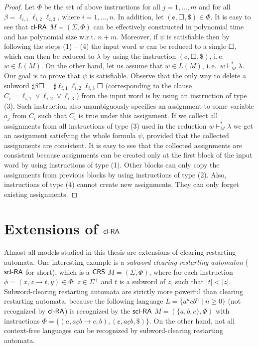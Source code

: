 \begin{proof}
Let $\Phi$ be the set of above instructions for all $j = 1, \ldots, m$ and for all $\beta = \ell_{i,1} \ell_{i,2} \ell_{i,3}$, where $i = 1, \ldots, n$. In addition, let $(\cent, \Square, \$) \in \Phi$. It is easy to see that $\clRA$ $M = (\Sigma, \Phi)$ can be effectively constructed in polynomial time and has polynomial size w.r.t. $n + m$. Moreover, if $\psi$ is satisfiable then by following the steps (1) -- (4) the input word $w$ can be reduced to a single $\Square$, which can then be reduced to $\lambda$ by using the instruction $(\cent, \Square, \$)$, i.\,e.\ $w \in L(M)$. On the other hand, let us assume that $w \in L(M)$, i.\,e.\ $w \vdash_M^* \lambda$. Our goal is to prove that $\psi$ is satisfiable. Observe that the only way to delete a subword $\sharp \beta \Square = \sharp \ell_{i,1} \ell_{i,2} \ell_{i,3} \Square$ (corresponding to the clause $C_i = \ell_{i,1} \vee \ell_{i,2} \vee \ell_{i,3}$) from the input word is by using an instruction of type (3). Such instruction also unambiguously specifies an assignment to some variable $a_j$ from $C_i$ such that $C_i$ is true under this assignment. If we collect all assignments from all instructions of type (3) used in the reduction $w \vdash_M^* \lambda$ we get an assignment satisfying the whole formula $\psi$, provided that the collected assignments are consistent. It is easy to see that the collected assignments are consistent because assignments can be created only at the first block of the input word by using instructions of type (1). Other blocks can only copy the assignments from previous blocks by using instructions of type (2). Also, instructions of type (4) cannot create new assignments. They can only forget existing assignments.
\end{proof}

\section[\texorpdfstring{Extensions of $\clRA$}%
                        {Extensions of cl-RA}]%
                        {Extensions of $\bm{\textup{\sf cl-RA\/}}$}%
\label{clra_extensions}

Almost all models studied in this thesis are extensions of clearing restarting automata. One interesting example is a \emph{subword-clearing restarting automaton} (\index{$\sclRA$}\emph{$\sclRA$} for short), which is a $\textup{\sf CRS\/}$ $M = (\Sigma, \Phi)$, where for each instruction  $\phi = (x, z \to t, y) \in \Phi$: $z \in \Sigma^+$ and $t$ is a subword of $z$, such that $|t| < |z|$. Subword-clearing restarting automata are strictly more powerful than clearing restarting automata, because the following language $L = \{a^n c b^n \mid n \ge 0\}$ (not recognized by $\clRA$) is recognized by the $\sclRA$ $M = (\{a, b, c\}, \Phi)$ with instructions $\Phi = \{(a, \underline{acb} \to c, b), (\cent, \underline{acb}, \$)\}$. On the other hand, not all context-free languages can be recognized by subword-clearing restarting automata.


